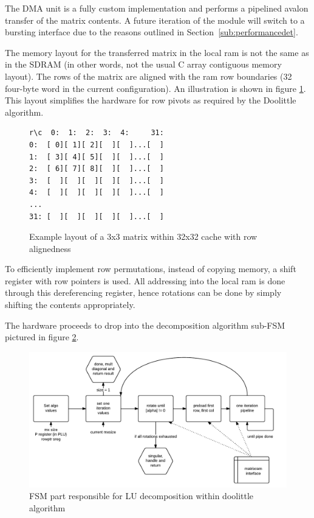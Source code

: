 \documentclass[]{article}
\begin{document}
The DMA unit is a fully custom implementation and performs a pipelined avalon transfer of the matrix contents. A future iteration of the module will switch to a bursting interface due to the reasons outlined in Section~\ref{sub:performancedet}. 

The memory layout for the transferred matrix in the local ram is not the same as in the SDRAM (in other words, not the usual C array contiguous memory layout). The rows of the matrix are aligned with the ram row boundaries (32 four-byte word in the current configuration).  An illustration is shown in figure \ref{fig:memlayout}. This layout simplifies the hardware for row pivots as required by the Doolittle algorithm.

\begin{figure}[tbp]
	\begin{center}
		\begin{lstlisting}
r\c  0:  1:  2:  3:  4:     31:
0:  [ 0][ 1][ 2][  ][  ]...[  ]
1:  [ 3][ 4][ 5][  ][  ]...[  ]
2:  [ 6][ 7][ 8][  ][  ]...[  ]
3:  [  ][  ][  ][  ][  ]...[  ]
4:  [  ][  ][  ][  ][  ]...[  ]
...
31: [  ][  ][  ][  ][  ]...[  ]

		\end{lstlisting}
	\end{center}
	\caption{Example layout of a 3x3 matrix within 32x32 cache with row alignedness}
	\label{fig:memlayout}
\end{figure}

To efficiently implement row permutations, instead of copying memory, a shift register with row pointers is used. All addressing into the local ram is done through this dereferencing register, hence rotations can be done by simply shifting the contents appropriately.

The hardware proceeds to drop into the decomposition algorithm sub-FSM pictured in figure \ref{fig:doolittle_fsm}.
\begin{figure}[tbp]
	\begin{center}
		\includegraphics[width = 1\textwidth]{DSDDoolitleFSM.pdf}
	\end{center}
	\caption{FSM part responsible for LU decomposition within doolittle algorithm}
	\label{fig:doolittle_fsm}
\end{figure}
\end{document}
